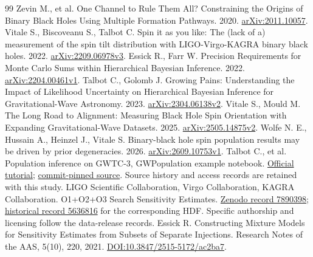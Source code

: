 \documentclass[a4paper,11pt]{article}
\begin{document}
\FloatBarrier
\begingroup\small
\setlength{\bibsep}{2pt}
\begin{thebibliography}{99}
 Zevin M., et al. One Channel to Rule Them All? Constraining the Origins of Binary Black Holes Using Multiple Formation Pathways. 2020. \href{https://arxiv.org/abs/2011.10057}{arXiv:2011.10057}.
 Vitale S., Biscoveanu S., Talbot C. Spin it as you like: The (lack of a) measurement of the spin tilt distribution with LIGO-Virgo-KAGRA binary black holes. 2022. \href{https://arxiv.org/abs/2209.06978v3}{arXiv:2209.06978v3}.
 Essick R., Farr W. Precision Requirements for Monte Carlo Sums within Hierarchical Bayesian Inference. 2022. \href{https://arxiv.org/abs/2204.00461v1}{arXiv:2204.00461v1}.
 Talbot C., Golomb J. Growing Pains: Understanding the Impact of Likelihood Uncertainty on Hierarchical Bayesian Inference for Gravitational-Wave Astronomy. 2023. \href{https://arxiv.org/html/2304.06138v2}{arXiv:2304.06138v2}.
 Vitale S., Mould M. The Long Road to Alignment: Measuring Black Hole Spin Orientation with Expanding Gravitational-Wave Datasets. 2025. \href{https://arxiv.org/html/2505.14875v2}{arXiv:2505.14875v2}.
 Wolfe N. E., Hussain A., Heinzel J., Vitale S. Binary-black hole spin population results may be driven by prior degeneracies. 2026. \href{https://arxiv.org/html/2609.10753v1}{arXiv:2609.10753v1}.
 Talbot C., et al. Population inference on GWTC-3, GWPopulation example notebook. \href{https://colmtalbot.github.io/gwpopulation/examples/GWTC3.html}{Official tutorial}; \href{https://github.com/ColmTalbot/gwpopulation/blob/2daa71e8c56362f2f64e2166a0055478557f239a/examples/GWTC3.ipynb}{commit-pinned source}. Source history and access records are retained with this study.
 LIGO Scientific Collaboration, Virgo Collaboration, KAGRA Collaboration. O1+O2+O3 Search Sensitivity Estimates. \href{https://zenodo.org/records/7890398}{Zenodo record 7890398}; \href{https://zenodo.org/records/5636816}{historical record 5636816} for the corresponding HDF. Specific authorship and licensing follow the data-release records.
 Essick R. Constructing Mixture Models for Sensitivity Estimates from Subsets of Separate Injections. Research Notes of the AAS, 5(10), 220, 2021. \href{https://doi.org/10.3847/2515-5172/ac2ba7}{DOI:10.3847/2515-5172/ac2ba7}.
\end{thebibliography}
\endgroup
\end{document}

